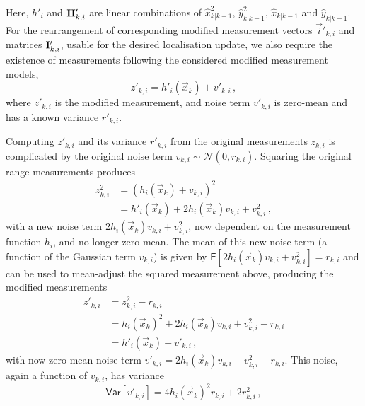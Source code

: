 Here, $h'_i$ and ${{\mathbf{H}}}'_{k,i}$ are linear combinations of $\hat{x}_{k|k-1}^2$, $\hat{y}_{k|k-1}^2$, $\hat{x}_{k|k-1}$ and $\hat{y}_{k|k-1}$. For the rearrangement of corresponding modified measurement vectors $\vec{i}'_{k, i}$ and matrices ${{\mathbf{I}}}'_{k, i}$, usable for the desired localisation update, we also require the existence of measurements following the considered modified measurement models,
\begin{equation}\label{eq:nonlin_fusion:modified_measurement_model}
    z'_{k,i} = h'_i(\vec{x}_k)+v'_{k,i}\,,
\end{equation}
where $z'_{k,i}$ is the modified measurement, and noise term $v'_{k,i}$ is zero-mean and has a known variance $r'_{k,i}$.

Computing $z'_{k,i}$ and its variance $r'_{k,i}$ from the original measurements $z_{k,i}$ is complicated by the original noise term $v_{k,i} \sim \mathcal{N}(0, r_{k,i})$. Squaring the original range measurements produces
\begin{equation}
    \begin{split}
        z_{k,i}^2 &= (h_i(\vec{x}_k) + v_{k,i})^2 \\
        &= h'_i(\vec{x}_k) + 2h_i(\vec{x}_k)v_{k,i} + v_{k,i}^2\,,
    \end{split}
\end{equation}
with a new noise term $2h_i(\vec{x}_k)v_{k,i} + v_{k,i}^2$, now dependent on the measurement function $h_i$, and no longer zero-mean. The mean of this new noise term (a function of the Gaussian term $v_{k, i}$) is given by $\mathsf{E}[2h_i(\vec{x}_k)v_{k, i} + v_{k, i}^2] = r_{k, i}$ and can be used to mean-adjust the squared measurement above, producing the modified measurements
\begin{equation}\label{eq:nonlin_fusion:modified_measurement}
    \begin{split}
        z'_{k,i} &= z_{k,i}^2 - r_{k,i} \\
        &= h_i(\vec{x}_k)^2 + 2h_i(\vec{x}_k)v_{k,i} + v_{k,i}^2 - r_{k,i} \\
        &= h'_i(\vec{x}_k) + v'_{k,i}\,,
    \end{split}
\end{equation}
with now zero-mean noise term $v'_{k,i} = 2h_i(\vec{x}_k)v_{k,i} + v_{k,i}^2 - r_{k,i}$. This noise, again a function of $v_{k,i}$, has variance 
\begin{equation}\label{eq:nonlin_fusion:modified_measurement_variance}
    \mathsf{Var}[v'_{k,i}] = 4h_i(\vec{x}_k)^2r_{k,i} + 2r_{k,i}^2\,,
\end{equation}
